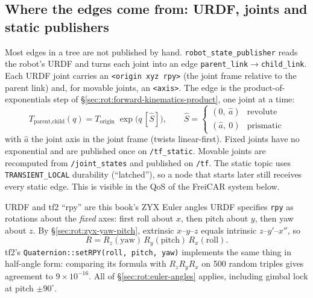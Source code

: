 \subsection{Where the edges come from: URDF, joints and static publishers}\label{sec:rot:tf-urdf}

Most edges in a tree are not published by hand. \texttt{robot\_state\_publisher} reads the robot's URDF and turns each joint into an edge \texttt{parent\_link}$\to$\texttt{child\_link}. Each URDF joint carries an \texttt{<origin xyz rpy>} (the joint frame relative to the parent link) and, for movable joints, an \texttt{<axis>}. The edge is the product-of-exponentials step of \S\ref{sec:rot:forward-kinematics-product}, one joint at a time:
\[
T_{\text{parent},\text{child}}(q)=T_{\text{origin}}\;\exp\!\big(q\,[\hat S]\big),\qquad
\hat S=\begin{cases}(0,\ \hat a)&\text{revolute}\\(\hat a,\ 0)&\text{prismatic}\end{cases}
\]
with $\hat a$ the joint axis in the joint frame (twists linear-first). Fixed joints have no exponential and are published once on \texttt{/tf\_static}. Movable joints are recomputed from \texttt{/joint\_states} and published on \texttt{/tf}. The static topic uses \texttt{TRANSIENT\_LOCAL} durability (``latched''), so a node that starts later still receives every static edge. This is visible in the QoS of the FreiCAR system below.

\begin{deriv}{URDF and tf2 ``rpy'' are this book's ZYX Euler angles}
URDF specifies \texttt{rpy} as rotations about the \emph{fixed} axes: first roll about $x$, then pitch about $y$, then yaw about $z$. By \S\ref{sec:rot:zyx-yaw-pitch}, extrinsic $x$--$y$--$z$ equals intrinsic $z$--$y'$--$x''$, so
\[
R=R_z(\text{yaw})\,R_y(\text{pitch})\,R_x(\text{roll}).
\]
tf2's \texttt{Quaternion::setRPY(roll, pitch, yaw)} implements the same thing in half-angle form: comparing its formula with $R_z R_y R_x$ on 500 random triples gives agreement to $9\times10^{-16}$. All of \S\ref{sec:rot:euler-angles} applies, including gimbal lock at pitch $\pm90^\circ$.
\end{deriv}

